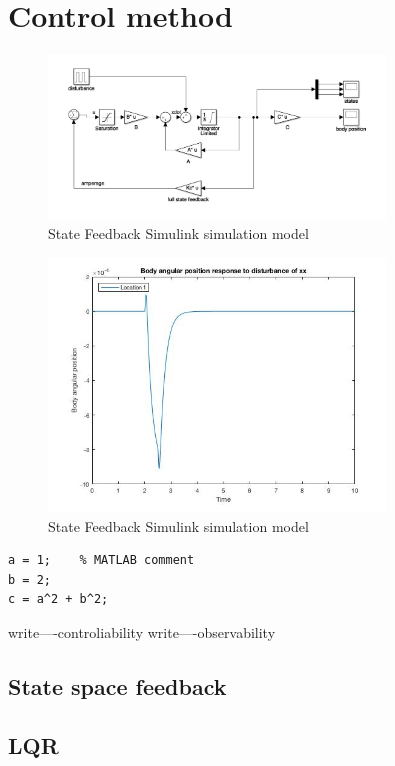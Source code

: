 \section{Control method}











\begin{figure}[H]
	\center
	\includegraphics[width=0.8\textwidth]{matlab/simpleSS.png}
	\caption{State Feedback Simulink simulation model } 
	\label{fig:mech} 		
\end{figure}		




\begin{figure}[H]
	\center
	\includegraphics[width=0.8\textwidth]{matlab/linresponse1.jpg}
	\caption{State Feedback Simulink simulation model } 
	\label{fig:mech} 		
\end{figure}		








\begin{lstlisting}
a = 1;    % MATLAB comment
b = 2;
c = a^2 + b^2;
\end{lstlisting}



write----controliability
write----observability



\subsection{State space feedback}

%




\subsection{LQR}


